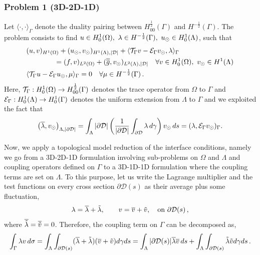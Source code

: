 \documentclass[r]{siamart171218}
\begin{document}
\subsubsection*{Problem 1 (3D-2D-1D)}
Let $\langle \cdot , \cdot \rangle_\Gamma$ denote the duality pairing between 
$H^\frac12_{00}(\Gamma)$ and $H^{-\frac12}(\Gamma)$. The problem consists to find $u \in H^1_0(\Omega), \ \lambda \in H^{-\frac12}(\Gamma ),\ u_{\odot} \in H^1_0(\Lambda)$, such that
\begin{subequations}\label{eq:problem1}
\begin{align}
&(u,v)_{H^1(\Omega)} + (u_{\odot},v_{\odot})_{H^1(\Lambda),|\mathcal{D}|} 
+ \langle {\mathcal{T}_\Gamma} v  - \mathcal{E}_\Gamma v_{\odot}, \lambda \rangle_\Gamma
\\
\nonumber
&\qquad\qquad= (f,v)_{L^2(\Omega)} +  (\overline{\overline{g}},v_{\odot})_{L^2(\Lambda),|\mathcal{D}|}
\quad \forall v \in H^1_0(\Omega), \ v_{\odot} \in H^1(\Lambda)
\\
&   \langle {\mathcal{T}_\Gamma} u - \mathcal{E}_\Gamma u_{\odot} , \mu \rangle_\Gamma = 0
\quad \forall \mu \in H^{-\frac12}(\Gamma)\,.
\end{align}
\end{subequations}
Here, ${\mathcal{T}_\Gamma}:H^1_0(\Omega) \rightarrow H^{\frac 12}_{00}(\Gamma)$ denotes the trace operator from $\Omega$ to $\Gamma$ and $\mathcal{E}_\Gamma: H^1_0(\Lambda) \rightarrow H^1_{0}(\Gamma)$ denotes the uniform extension from $\Lambda$ to $\Gamma$ and we exploited the fact that 
\begin{equation*}
\left( \overline{\lambda}, v_{\odot} \right)_{\Lambda, |\partial\mathcal{D}|} 
= \int _{\Lambda} |\partial\mathcal{D}| \left( \frac{1}{|\partial\mathcal{D}|} \int_{\partial\mathcal{D}} \lambda \, d\gamma \right) v_{\odot} \, ds 
= (\lambda, \mathcal{E}_\Gamma v_{\odot})_{\Gamma}.
\end{equation*} 

Now, we apply a topological model reduction of the interface conditions, namely we go from a 3D-2D-1D formulation
involving sub-problems on $\Omega$ and $\Lambda$ and coupling operators defined on $\Gamma$
to a 3D-1D-1D formulation where the coupling terms are set on $\Lambda$. 
To this purpose, let us write the Lagrange multiplier and the test functions on every cross section $\partial\mathcal{D}(s)$ as their average plus some fluctuation,
\begin{equation*}
\lambda=\overline{\lambda}+\tilde{\lambda}, \qquad v=\overline{v}+\tilde{v},
\quad \text{on} \ \partial\mathcal{D}(s)\,,
\end{equation*}
where $\overline{\tilde{\lambda}}=\overline{\tilde{v}}=0$. 
Therefore, the coupling term on $\Gamma$ can be decomposed as,
\begin{equation*}
\int_{\Gamma}\lambda v\, d\sigma
=\int _{\Lambda}  \int_{\partial\mathcal{D}(s)} (\overline{\lambda}+\tilde{\lambda})(\overline{v}+\tilde{v})d\gamma ds
= \int_{\Lambda}|\partial\mathcal{D}(s)| \overline{\lambda}\overline{v}\,ds+\int_{\Lambda}  \int_{\partial\mathcal{D}(s)} \tilde{\lambda}\tilde{v}d\gamma ds\,.
\end{equation*}
\end{document}
